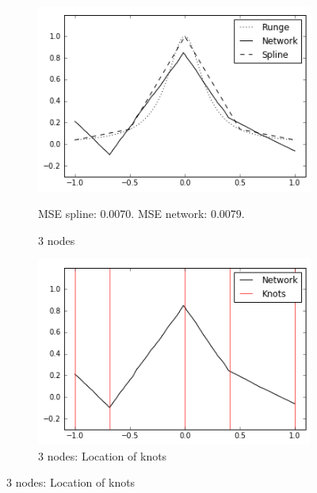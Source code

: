 \documentclass[11pt, letterpaper]{amsart}
\begin{document}
\begin{figure}[H]
    \begin{subfigure}{.45\textwidth}
        \includegraphics[width=\textwidth]{3nodes1.png}
        \caption{3 nodes}
            \begin{tablenotes}
                 \tiny
            	\item  MSE spline: 0.0070. MSE network: 0.0079.
        	\end{tablenotes}
    \end{subfigure}
    \quad
    \begin{subfigure}{.45\textwidth}
        \includegraphics[width=\textwidth]{3nodes2.png}
        \caption{3 nodes: Location of knots}
    \end{subfigure}


\end{figure}
\end{document}

